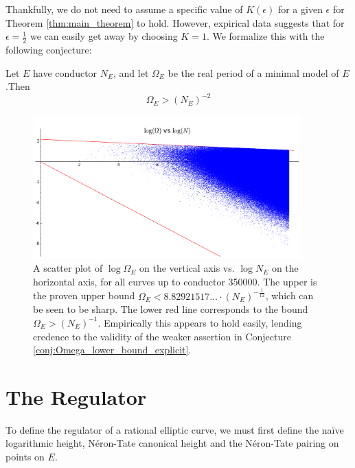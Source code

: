 Thankfully, we do not need to assume a specific value of $K(\epsilon)$ for a given $\epsilon$ for Theorem \ref{thm:main_theorem} to hold. However, expirical data suggests that for $\epsilon=\frac{1}{2}$ we can easily get away by choosing $K = 1$. We formalize this with the following conjecture:
\begin{conjecture}\label{conj:Omega_lower_bound_explicit}
Let $E$ have conductor $N_E$, and let $\Omega_E$ be the real period of a minimal model of $E$.Then 
\begin{equation}
\Omega_E > (N_E)^{-2}
\end{equation}
\end{conjecture}

\begin{figure}[!h]
    \centering
    \includegraphics[width=0.92\textwidth]{graphics/real_periods_vs_conductors_loglog}
    \caption{A scatter plot of $\log \Omega_E $ on the vertical axis vs. $\log N_E$ on the horizontal axis, for all curves up to conductor 350000. The upper is the proven upper bound $\Omega_E < 8.82921517\ldots \cdot (N_E)^{-\frac{1}{12}}$, which can be seen to be sharp. The lower red line corresponds to the bound $\Omega_E > (N_E)^{-1}$. Empirically this appears to hold easily, lending credence to the validity of the weaker assertion in Conjecture \ref{conj:Omega_lower_bound_explicit}.}
    \label{fig:real_period_vs_conductor_loglog}
\end{figure}

\newpage
\section{The Regulator}

To define the regulator of a rational elliptic curve, we must first define the na\"ive logarithmic height, N\'eron-Tate canonical height and the N\'eron-Tate pairing on points on $E$.

